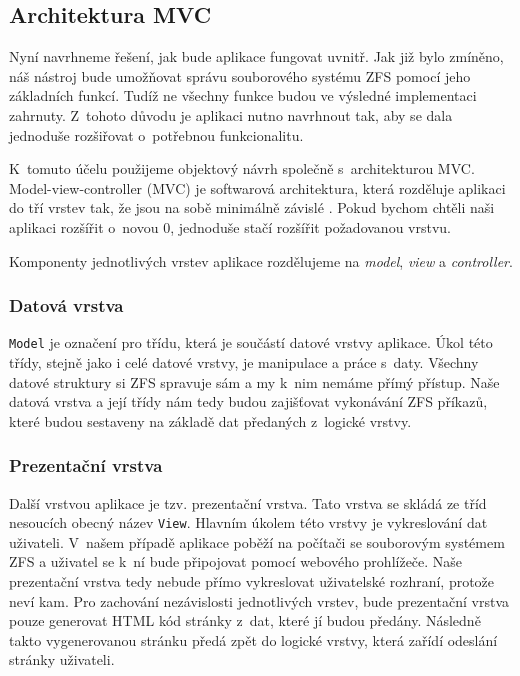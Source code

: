     \subsection{Architektura MVC}
    Nyní navrhneme řešení, jak bude aplikace fungovat uvnitř. Jak již bylo zmíněno, náš nástroj bude umožňovat správu souborového systému ZFS pomocí jeho základních funkcí. Tudíž ne všechny funkce budou ve výsledné implementaci zahrnuty. Z~tohoto důvodu je aplikaci nutno navrhnout tak, aby se dala jednoduše rozšiřovat o~potřebnou funkcionalitu.

    K~tomuto účelu použijeme objektový návrh společně s~architekturou MVC. Model-view-controller (MVC) je softwarová architektura, která rozděluje aplikaci do tří vrstev tak, že jsou na sobě minimálně závislé \cite{mvc}. Pokud bychom chtěli naši aplikaci rozšířit o~novou 0, jednoduše stačí rozšířit požadovanou vrstvu.

    Komponenty jednotlivých vrstev aplikace rozdělujeme na \emph{model}, \emph{view} a \emph{controller}.

        \subsubsection{Datová vrstva}
        \verb|Model| je označení pro třídu, která je součástí datové vrstvy aplikace. Úkol této třídy, stejně jako i celé datové vrstvy, je manipulace a práce s~daty. Všechny datové struktury si ZFS spravuje sám a my k~nim nemáme přímý přístup. Naše datová vrstva a její třídy nám tedy budou zajišťovat vykonávání ZFS příkazů, které budou sestaveny na základě dat předaných z~logické vrstvy.
        \subsubsection{Prezentační vrstva}
        Další vrstvou aplikace je tzv. prezentační vrstva. Tato vrstva se skládá ze tříd nesoucích obecný název \verb|View|. Hlavním úkolem této vrstvy je vykreslování dat uživateli. V~našem případě aplikace poběží na počítači se souborovým systémem ZFS a uživatel se k~ní bude připojovat pomocí webového prohlížeče. Naše prezentační vrstva tedy nebude přímo vykreslovat uživatelské rozhraní, protože neví kam. Pro zachování nezávislosti jednotlivých vrstev, bude prezentační vrstva pouze generovat HTML kód stránky z~dat, které jí budou předány. Následně takto vygenerovanou stránku předá zpět do logické vrstvy, která zařídí odeslání stránky uživateli.
